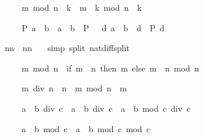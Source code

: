 \begin{isabellebody}
\begin{isamarkuptext}
\begin{isabelle}%
\ \ \ \ \ m\ mod\ n\ {\isacharasterisk}\ k\ {\isacharequal}\ m\ {\isacharasterisk}\ k\ mod\ {\isacharparenleft}n\ {\isacharasterisk}\ k{\isacharparenright}%
\end{isabelle}

\begin{isabelle}%
\ \ \ \ \ P\ {\isacharparenleft}a\ {\isacharminus}\ b{\isacharparenright}\ {\isacharequal}\ {\isacharparenleft}{\isacharparenleft}a\ {\isacharless}\ b\ {\isasymlongrightarrow}\ P\ {}{\isacharparenright}\ {\isasymand}\ {\isacharparenleft}{\isasymforall}d{\isachardot}\ a\ {\isacharequal}\ b\ {\isacharplus}\ d\ {\isasymlongrightarrow}\ P\ d{\isacharparenright}{\isacharparenright}%
\end{isabelle}
%
\end{isamarkuptext}%
\ {\isachardoublequote}{\isacharparenleft}n{\isacharminus}{}{\isacharparenright}{\isacharasterisk}{\isacharparenleft}n{\isacharplus}{}{\isacharparenright}\ {\isacharequal}\ n{\isacharasterisk}n\ {\isacharminus}\ {}{\isachardoublequote}\isanewline
{}\ {\isacharparenleft}simp\ split{\isacharcolon}\ nat{\isacharunderscore}diff{\isacharunderscore}split{\isacharparenright}\isanewline
{}%
\begin{isamarkuptext}%
\begin{isabelle}%
\ \ \ \ \ m\ mod\ n\ {\isacharequal}\ {\isacharparenleft}if\ m\ {\isacharless}\ n\ then\ m\ else\ {\isacharparenleft}m\ {\isacharminus}\ n{\isacharparenright}\ mod\ n{\isacharparenright}%
\end{isabelle}

\begin{isabelle}%
\ \ \ \ \ m\ div\ n\ {\isacharasterisk}\ n\ {\isacharplus}\ m\ mod\ n\ {\isacharequal}\ m%
\end{isabelle}


\begin{isabelle}%
\ \ \ \ \ a\ {\isacharasterisk}\ b\ div\ c\ {\isacharequal}\ a\ {\isacharasterisk}\ {\isacharparenleft}b\ div\ c{\isacharparenright}\ {\isacharplus}\ a\ {\isacharasterisk}\ {\isacharparenleft}b\ mod\ c{\isacharparenright}\ div\ c%
\end{isabelle}

\begin{isabelle}%
\ \ \ \ \ a\ {\isacharasterisk}\ b\ mod\ c\ {\isacharequal}\ a\ {\isacharasterisk}\ {\isacharparenleft}b\ mod\ c{\isacharparenright}\ mod\ c%
\end{isabelle}


\end{isamarkuptext}
\end{isabellebody}
